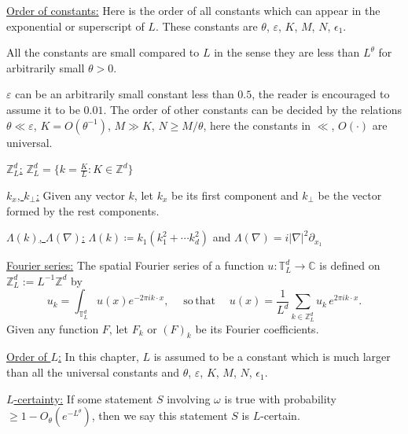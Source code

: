 \underline{Order of constants:} Here is the order of all constants which can appear in the exponential or superscript of $L$. These constants are $\theta$, $\varepsilon$, $K$, $M$, $N$, $\epsilon_1$.%

All the constants are small compared to $L$ in the sense they are less than $L^{\theta}$ for arbitrarily small $\theta>0$.

$\varepsilon$ can be an arbitrarily small constant less than $0.5$, the reader is encouraged to assume it to be $0.01$. The order of other constants can be decided by the relations $\theta\ll \varepsilon$, $K=O(\theta^{-1})$, $M\gg K$, $N\ge M/\theta$, here the constants in $\ll$, $O(\cdot)$ are universal. 

\underline{$\mathbb{Z}_L^d$:} $\mathbb{Z}_L^d= \{k=\frac{K}{L}:K\in \mathbb{Z}^d\}$

\underline{$k_x$, $k_{\perp}$:} Given any vector $k$, let $k_x$ be its first component and $k_{\perp}$ be the vector formed by the rest components. 

\underline{$\Lambda(k)$, $\Lambda(\nabla)$:} $\Lambda(k)\coloneqq k_{1}(k_1^2+\cdots k_d^2)$ and $\Lambda(\nabla) = i|\nabla|^2\partial_{x_1}$

\underline{Fourier series:} The spatial Fourier series of a function $u: \mathbb{T}_L^d \to \mathbb C$ is defined on $\mathbb{Z}^d_L:=L^{-1}\mathbb{Z}^{d}$ by
\begin{equation}\label{fourierset}
u_k=\int_{\mathbb{T}^d_L} u(x) e^{-2\pi i k\cdot x},\quad \mathrm{\; so \,that \;}\quad u(x)=\frac{1}{L^d}\sum_{k \in \mathbb{Z}^d_L} u_k \,e^{2\pi i k\cdot x}. 
\end{equation}
Given any function $F$, let $F_k$ or $(F)_k$ be its Fourier coefficients.

\underline{Order of $L$:} In this chapter, $L$ is assumed to be a constant which is much larger than all the universal constants and $\theta$, $\varepsilon$, $K$, $M$, $N$, $\epsilon_1$. 

\underline{$L$-certainty:} If some statement $S$ involving $\omega$ is true with probability $\geq 1-O_{\theta}(e^{-L^\theta})$, then we say this statement $S$ is $L$-certain.

